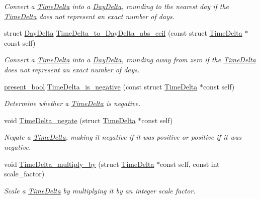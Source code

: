 \begin{DoxyCompactItemize}
\begin{DoxyCompactList}\small\item\em Convert a \hyperlink{structTimeDelta}{Time\-Delta} into a \hyperlink{structDayDelta}{Day\-Delta}, rounding to the nearest day if the \hyperlink{structTimeDelta}{Time\-Delta} does not represent an exact number of days. \end{DoxyCompactList}\item 
struct \hyperlink{structDayDelta}{Day\-Delta} \hyperlink{time-delta_8h_ae1a3f58fc84a366415dc6cde308b27ee}{Time\-Delta\-\_\-to\-\_\-\-Day\-Delta\-\_\-abs\-\_\-ceil} (const struct \hyperlink{structTimeDelta}{Time\-Delta} $\ast$const self)
\begin{DoxyCompactList}\small\item\em Convert a \hyperlink{structTimeDelta}{Time\-Delta} into a \hyperlink{structDayDelta}{Day\-Delta}, rounding away from zero if the \hyperlink{structTimeDelta}{Time\-Delta} does not represent an exact number of days. \end{DoxyCompactList}\item 
\hyperlink{types_8h_a1c24e2cdd988b886e889080ded176ae0}{present\-\_\-bool} \hyperlink{time-delta_8h_a4fc42a10abf8771117d2f9ced4f11bf2}{Time\-Delta\-\_\-is\-\_\-negative} (const struct \hyperlink{structTimeDelta}{Time\-Delta} $\ast$const self)
\begin{DoxyCompactList}\small\item\em Determine whether a \hyperlink{structTimeDelta}{Time\-Delta} is negative. \end{DoxyCompactList}\item 
void \hyperlink{time-delta_8h_a906aa66074e2d9ef675ea2d2a1d25084}{Time\-Delta\-\_\-negate} (struct \hyperlink{structTimeDelta}{Time\-Delta} $\ast$const self)
\begin{DoxyCompactList}\small\item\em Negate a \hyperlink{structTimeDelta}{Time\-Delta}, making it negative if it was positive or positive if it was negative. \end{DoxyCompactList}\item 
void \hyperlink{time-delta_8h_a772db85da3c67f149da8877ac8d04fad}{Time\-Delta\-\_\-multiply\-\_\-by} (struct \hyperlink{structTimeDelta}{Time\-Delta} $\ast$const self, const int scale\-\_\-factor)
\begin{DoxyCompactList}\small\item\em Scale a \hyperlink{structTimeDelta}{Time\-Delta} by multiplying it by an integer scale factor. \end{DoxyCompactList}\item 

\end{DoxyCompactItemize}
